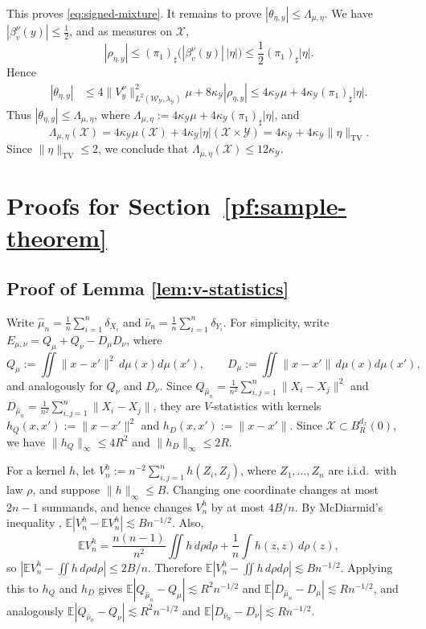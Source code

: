 \documentclass[11pt]{amsart}
\theoremstyle{definition}
\theoremstyle{remark}
\newcommand{\E}{\mathbb{E}}
\newcommand{\1}{\mathbf{1}}
\numberwithin{equation}{section}
\newcommand{\TV}{\mathrm{TV}}
\begin{document}
This proves \eqref{eq:signed-mixture}. It remains to prove $|\theta_{\eta,y}|\le \Lambda_{\mu,\eta}$. We have $|\beta_v^\nu(y)|\le \frac12$, and as measures on $\mathcal X$,
\[
|\rho_{\eta,y}|
\le
(\pi_1)_\sharp\bigl(|\beta_v^\nu(y)|\,|\eta|\bigr)
\le
\frac12(\pi_1)_\sharp|\eta|.
\]
Hence
\begin{align*}
|\theta_{\eta,y}|
&\le
4\|V_y^\nu\|^2_{L^2(\mathcal W_\mathcal Y,\lambda_\mathcal Y)}\mu
+8\kappa_{\mathcal Y}|\rho_{\eta,y}|
\leq 
4\kappa_{\mathcal Y}\mu
+4\kappa_{\mathcal Y}(\pi_1)_\sharp|\eta|.
\end{align*}
Thus $|\theta_{\eta,y}|\leq \Lambda_{\mu,\eta}$, where $\Lambda_{\mu,\eta}
:=
4\kappa_{\mathcal Y}\mu
+
4\kappa_{\mathcal Y}(\pi_1)_\sharp|\eta|$, and 
\[
\Lambda_{\mu,\eta}(\mathcal X)
=
4\kappa_{\mathcal Y}\mu(\mathcal X)
+
4\kappa_{\mathcal Y}|\eta|(\mathcal X\times \mathcal Y)
=
4\kappa_{\mathcal Y}
+
4\kappa_{\mathcal Y}\|\eta\|_{\TV}.
\]
Since $\|\eta\|_{\TV}\le 2$, we conclude that $\Lambda_{\mu,\eta}(\mathcal X) \leq 12\kappa_{\mathcal Y}$.
\section{Proofs for Section~\ref{pf:sample-theorem}}\label{sec:sample-proofs}
\subsection{Proof of Lemma \ref{lem:v-statistics}}\label{pf:v-statistics}

Write $\widehat\mu_n=\frac1n\sum_{i=1}^n\delta_{X_i}$ and
$\widehat\nu_n=\frac1n\sum_{i=1}^n\delta_{Y_i}$. For simplicity, write
$E_{\mu,\nu}=Q_\mu+Q_\nu-D_\mu D_\nu$, where
\[
Q_\mu:=\iint\|x-x'\|^2\,d\mu(x)d\mu(x'),
\qquad
D_\mu:=\iint\|x-x'\|\,d\mu(x)d\mu(x'),
\]
and analogously for $Q_\nu$ and $D_\nu$. Since
$Q_{\widehat\mu_n}=\frac1{n^2}\sum_{i,j=1}^n \|X_i-X_j\|^2$
and $D_{\widehat\mu_n}=\frac1{n^2}\sum_{i,j=1}^n \|X_i-X_j\|$, they are
$V$-statistics with kernels $h_Q(x,x'):=\|x-x'\|^2$ and
$h_D(x,x'):=\|x-x'\|$. Since $\mathcal X\subset B^{d_x}_{R}(0)$, we have
$\|h_Q\|_\infty\le 4R^2$ and $\|h_D\|_\infty\le 2R$.

For a kernel $h$, let $V_n^h:=n^{-2}\sum_{i,j=1}^n h(Z_i,Z_j)$, where
$Z_1,\ldots,Z_n$ are i.i.d.\ with law $\rho$, and suppose
$\|h\|_\infty\le B$. Changing one coordinate changes at most $2n-1$
summands, and hence changes $V_n^h$ by at most $4B/n$. By McDiarmid's
inequality \cite{mcdiarmid1989bounded},
$\E|V_n^h-\E V_n^h|\lesssim Bn^{-1/2}$. Also,
\[
\E V_n^h
=
\frac{n(n-1)}{n^2}\iint h\,d\rho d\rho
+
\frac1n\int h(z,z)\,d\rho(z),
\]
so $|\E V_n^h-\iint h\,d\rho d\rho|\le 2B/n$. Therefore
$\E\left|V_n^h-\iint h\,d\rho d\rho\right|\lesssim Bn^{-1/2}$.
Applying this to $h_Q$ and $h_D$ gives
$\E|Q_{\widehat\mu_n}-Q_\mu|\lesssim R^2n^{-1/2}$ and
$\E|D_{\widehat\mu_n}-D_\mu|\lesssim Rn^{-1/2}$, and analogously
$\E|Q_{\widehat\nu_n}-Q_\nu|\lesssim R^2n^{-1/2}$ and
$\E|D_{\widehat\nu_n}-D_\nu|\lesssim Rn^{-1/2}$.
\end{document}
